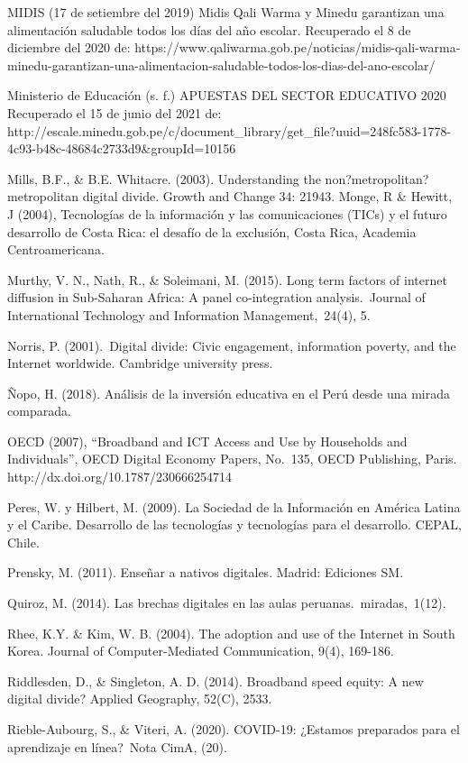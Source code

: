 MIDIS (17 de setiembre del 2019) Midis Qali Warma y Minedu garantizan
una alimentación saludable todos los días del año escolar. Recuperado el
8 de diciembre del 2020 de:
https://www.qaliwarma.gob.pe/noticias/midis-qali-warma-minedu-garantizan-una-alimentacion-saludable-todos-los-dias-del-ano-escolar/

Ministerio de Educación (s. f.) APUESTAS DEL SECTOR EDUCATIVO 2020
Recuperado el 15 de junio del 2021 de:
http://escale.minedu.gob.pe/c/document\_library/get\_file?uuid=248fc583-1778-4c93-b48c-48684c2733d9\&groupId=10156

Mills, B.F., \& B.E. Whitacre. (2003). Understanding the
non?metropolitan?metropolitan digital divide. Growth and Change 34:
21943. Monge, R \& Hewitt, J (2004), Tecnologías de la información y las
comunicaciones (TICs) y el futuro desarrollo de Costa Rica: el desafío
de la exclusión, Costa Rica, Academia Centroamericana.

Murthy, V. N., Nath, R., \& Soleimani, M. (2015). Long term factors of
internet diffusion in Sub-Saharan Africa: A panel co-integration
analysis.~Journal of International Technology and Information
Management,~24(4), 5.

Norris, P. (2001).~Digital divide: Civic engagement, information
poverty, and the Internet worldwide. Cambridge university press.

Ñopo, H. (2018). Análisis de la inversión educativa en el Perú desde una
mirada comparada.

OECD (2007), ``Broadband and ICT Access and Use by Households and
Individuals'', OECD Digital Economy Papers, No.~135, OECD Publishing,
Paris. http://dx.doi.org/10.1787/230666254714

Peres, W. y Hilbert, M. (2009). La Sociedad de la Información en América
Latina y el Caribe. Desarrollo de las tecnologías y tecnologías para el
desarrollo. CEPAL, Chile.

Prensky, M. (2011). Enseñar a nativos digitales. Madrid: Ediciones SM.

Quiroz, M. (2014). Las brechas digitales en las aulas
peruanas.~miradas,~1(12).

Rhee, K.Y. \& Kim, W. B. (2004). The adoption and use of the Internet in
South Korea. Journal of Computer-Mediated Communication, 9(4), 169-186.

Riddlesden, D., \& Singleton, A. D. (2014). Broadband speed equity: A
new digital divide? Applied Geography, 52(C), 2533.

Rieble-Aubourg, S., \& Viteri, A. (2020). COVID-19: ¿Estamos preparados
para el aprendizaje en línea?~Nota CimA, (20).

